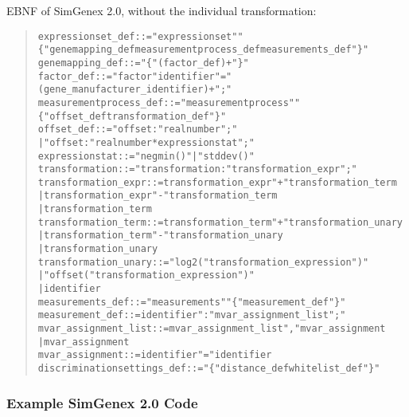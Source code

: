 \documentclass[a4paper,fleqn]{article}
\newenvironment{ebnfrule}{\begin{footnotesize}\begin{quote}\begin{alltt}}{\end{alltt}\end{quote}\end{footnotesize}}
\begin{document}
EBNF of SimGenex 2.0, without the individual transformation:

\begin{ebnfrule}
expressionset_def ::= "expressionset" "\{" genemapping_def measurementprocess_def measurements_def "\}"
genemapping_def ::= "\{" (factor_def)+ "\}"
factor_def ::= "factor" identifier "=" (gene_manufacturer_identifier)+ ";"
measurementprocess_def ::= "measurementprocess" "\{" offset_def transformation_def "\}"
offset_def ::= "offset:" realnumber ";"
        | "offset:" realnumber * expressionstat ";"
expressionstat ::= "negmin()" | "stddev()"
transformation ::= "transformation:" transformation_expr ";"
transformation_expr ::= transformation_expr "+" transformation_term
        | transformation_expr "-" transformation_term
        | transformation_term
transformation_term ::= transformation_term "+" transformation_unary
        | transformation_term "-" transformation_unary
        | transformation_unary
transformation_unary ::= "log2(" transformation_expression ")"
        | "offset(" transformation_expression ")"
        | identifier
measurements_def ::=  "measurements" "\{" measurement_def "\}"
measurement_def ::= identifier ":" mvar_assignment_list ";"
mvar_assignment_list ::= mvar_assignment_list "," mvar_assignment
        | mvar_assignment
mvar_assignment ::= identifier "=" identifier
discriminationsettings_def ::= "\{"  distance_def whitelist_def "\}"
\end{ebnfrule}

\subsubsection{Example SimGenex 2.0 Code}
\end{document}
